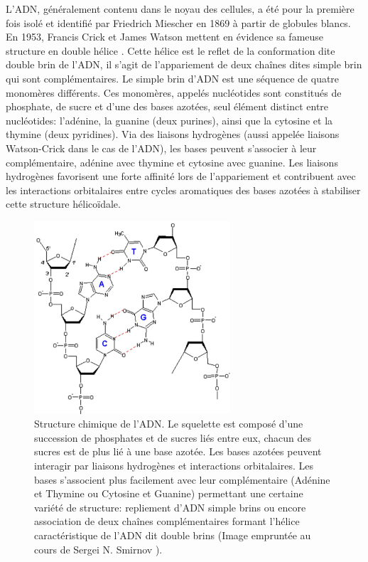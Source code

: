 \documentclass[a4paper,11pt]{article}
\begin{document}
L'ADN, généralement contenu dans le noyau des cellules, a été pour la première fois isolé et identifié par Friedrich Miescher en 1869 à partir de globules blancs. En 1953, Francis Crick et James Watson mettent en évidence sa fameuse structure en double hélice \cite{watsoncrick}. Cette hélice est le reflet de la conformation dite double brin de l'ADN, il s'agit de l'appariement de deux chaînes dites simple brin qui sont complémentaires. Le simple brin d'ADN est une séquence de quatre monomères différents. Ces monomères, appelés nucléotides sont constitués de phosphate, de sucre et d'une des bases azotées, seul élément distinct entre nucléotides: l'adénine, la guanine (deux purines), ainsi que la cytosine et la thymine (deux pyridines). Via des liaisons hydrogènes (aussi appelée liaisons Watson-Crick dans le cas de l'ADN), les bases peuvent s'associer à leur complémentaire, adénine avec thymine et cytosine avec guanine. Les liaisons hydrogènes favorisent une forte affinité lors de l'appariement et contribuent avec les interactions orbitalaires entre cycles aromatiques des bases azotées à stabiliser cette structure hélicoïdale.

\begin{figure}[H]
\begin{center}
\includegraphics[width=0.65\textwidth]{adn.jpg}

\caption{Structure chimique de l'ADN. Le squelette est composé d'une succession de phosphates et de sucres liés entre eux, chacun des sucres est de plus lié à une base azotée. Les bases azotées peuvent interagir par liaisons hydrogènes et interactions orbitalaires. Les bases s'associent plus facilement avec leur complémentaire (Adénine et Thymine ou Cytosine et Guanine) permettant une certaine variété de structure: repliement d'ADN simple brins ou encore association de deux cha\^{i}nes complémentaires formant l'hélice caractéristique de l'ADN dit double brins (Image empruntée au cours de Sergei N. Smirnov \cite{adnjpg}).}
\label{adn}
\end{center}
\end{figure}
\end{document}
